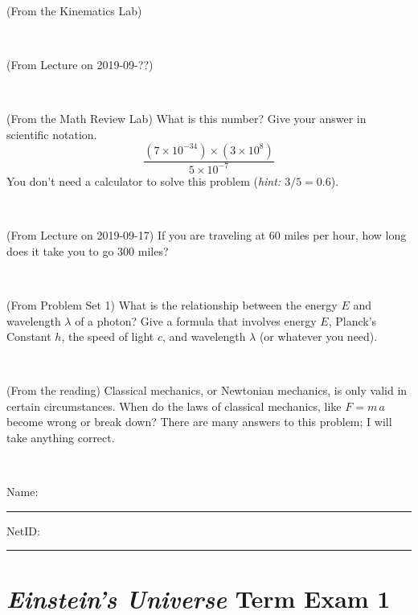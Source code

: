 \documentclass[12pt, letterpaper]{article}
\begin{document}
\begin{problem} (From the Kinematics Lab)

\end{problem}


\vfill ~

\begin{problem} (From Lecture on 2019-09-??)
\end{problem}


\vfill ~


\clearpage


\begin{problem} (From the Math Review Lab)
What is this number? Give your answer in scientific notation.
$$
\frac{(7\times10^{-34})\times(3\times10^8)}{5\times10^{-7}}
$$
You don't need a calculator to solve this problem (\textit{hint: $3/5=0.6$}).
\end{problem}


\vfill ~

\begin{problem} (From Lecture on 2019-09-17)
If you are traveling at 60 miles per hour, how long does
it take you to go 300 miles?
\end{problem}


\vfill ~

\begin{problem} (From Problem Set 1)
What is the relationship between the energy $E$ and wavelength
$\lambda$ of a photon? Give a formula that involves energy $E$,
Planck's Constant $h$, the speed of light $c$, and wavelength
$\lambda$ (or whatever you need).
\end{problem}

\vfill ~

\begin{problem} (From the reading)
Classical mechanics, or Newtonian mechanics, is only valid in certain
circumstances. When do the laws of classical mechanics, like $F =
m\,a$ become wrong or break down? There are many answers to this
problem; I will take anything correct.
\end{problem}


\vfill ~


\cleardoublepage



\noindent
Name: \rule[-1ex]{0.60\textwidth}{0.1pt}
NetID: \rule[-1ex]{0.20\textwidth}{0.1pt}

\section*{\textsl{Einstein's Universe} Term Exam 1}
\setcounter{problem}{1}
\end{document}
